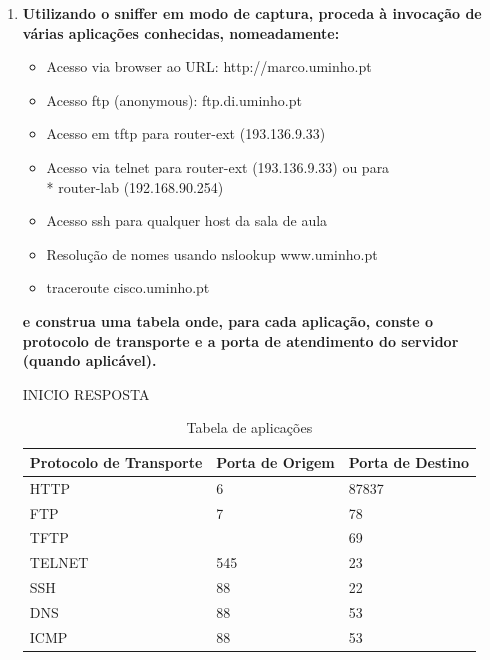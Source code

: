 \documentclass{llncs}
\begin{document}
\begin{enumerate}[\textbf{b)}]
  \item \textbf{Utilizando o sniffer em modo de captura, proceda à invocação de várias aplicações conhecidas, nomeadamente:}
  \vspace{5mm}
  \begin{itemize}
      \item Acesso via browser ao URL: http://marco.uminho.pt
      \item Acesso ftp (anonymous): ftp.di.uminho.pt
      \item Acesso em tftp para router-ext (193.136.9.33)
      \item Acesso via telnet para router-ext (193.136.9.33) ou para\\*
      router-lab (192.168.90.254)
      \item Acesso ssh para qualquer host da sala de aula
      \item Resolução de nomes usando nslookup www.uminho.pt
      \item traceroute cisco.uminho.pt
  \end{itemize}
  \par \textbf{e construa uma tabela onde, para cada aplicação, conste o protocolo de transporte e a porta de atendimento do
  servidor (quando aplicável).}
  
  \vspace{5mm}
  INICIO RESPOSTA
   
  \begin{table}[h!]
    \centering
    \begin{tabular}{p{4.4cm}  p{3cm}  p{3cm}} 
     \hline
     \textbf{Protocolo de Transporte} & \textbf{Porta de Origem} & \textbf{Porta de Destino}\\ [1ex] 
     \hline\hline
     HTTP & 6 & 87837 \\ [1ex]
     FTP & 7 & 78 \\ [1ex]
     TFTP &  & 69 \\ [1ex]
     TELNET & 545 & 23 \\ [1ex]
     SSH & 88 & 22 \\ [1ex]
     DNS & 88 & 53 \\ [1ex]
     ICMP & 88 & 53 \\ [1ex] 
     \hline
    \end{tabular}
    \caption{Tabela de aplicações}
    \label{table:1}
    \end{table}


\end{enumerate}
\end{document}
